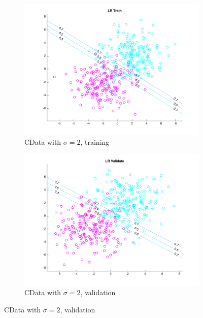 \begin{figure}[h!]
    \begin{subfigure}[b]{0.4\textwidth}
	\includegraphics[scale=0.4]{hw2_1_stdev2_a.pdf}
	\caption{CData with $\sigma = 2$, training}\label{fig:data_stdev2a}
	\end{subfigure}
	\quad	
	\begin{subfigure}[b]{0.4\textwidth}
	\includegraphics[scale=0.4]{hw2_1_stdev2_b.pdf}
	\caption{CData with $\sigma = 2$, validation}\label{fig:data_stdev2b}
	\end{subfigure}
    

\end{figure}
